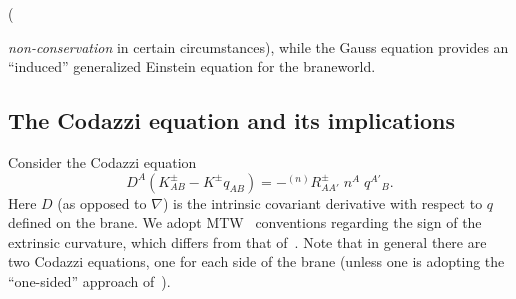 \documentclass[a4paper,10pt]{article}
\begin{document}
({\emph{non-conservation} in certain circumstances), while the Gauss
equation provides an ``induced'' generalized Einstein equation for the
braneworld.


\subsection{The Codazzi equation and its implications}

Consider the Codazzi equation~\cite{Shiromizu}
%
\begin{equation}
D^A (K_{AB}^\pm -  K^\pm q_{AB}) = - {}^{(n)}R_{AA'}^\pm \; n^A \; q^{A'}{}_B.
\end{equation}
%
Here $D$ (as opposed to $\nabla$) is the intrinsic covariant
derivative with respect to $q$ defined on the brane. We adopt
MTW~\cite{MTW} conventions regarding the sign of the extrinsic
curvature, which differs from that of~\cite{Shiromizu}. Note that in
general there are two Codazzi equations, one for each side of the
brane (unless one is adopting the ``one-sided'' approach
of~\cite{void,edge}).

}
\end{document}
